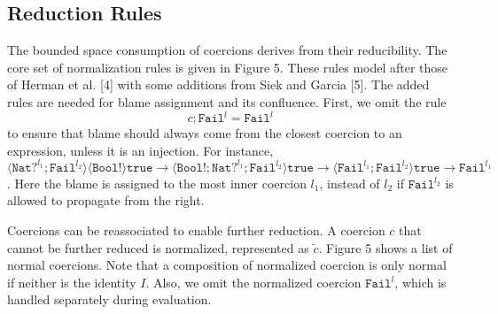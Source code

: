 \subsection{Reduction Rules}
The bounded space consumption of coercions derives from their reducibility. 
The core set of normalization rules is given in Figure 5. These rules model 
after those of Herman et al. [4] with some additions from Siek and Garcia [5]. 
The added rules are needed for blame assignment and its confluence. First, 
we omit the rule 
\begin{equation*}
    c;\texttt{Fail}^l = \texttt{Fail}^l
\end{equation*}
to ensure that blame should always come from the closest coercion to an 
expression, unless it is an injection. For instance, $\langle \texttt{Nat}?^{l_1};\texttt{Fail}^{l_2} 
\rangle \langle \texttt{Bool}! \rangle \texttt{true} \longrightarrow 
\langle \texttt{Bool}!;\texttt{Nat}?^{l_1};\texttt{Fail}^{l_2} \rangle \texttt{true}
\longrightarrow \langle \texttt{Fail}^{l_1};\texttt{Fail}^{l_2} \rangle \texttt{true}
\longrightarrow \texttt{Fail}^{l_1}$. Here the blame is assigned to the 
most inner coercion $l_1$, instead of $l_2$ 
if $\texttt{Fail}^{l_2}$ is allowed to propagate from the right. 

Coercions can be reassociated to enable further reduction. A coercion $c$ that 
cannot be further reduced is normalized, represented as $\tilde{c}$. Figure 
5 shows a list of normal coercions. Note that a composition of normalized 
coercion is only normal if neither is the identity $I$. Also, we omit 
the normalized coercion $\texttt{Fail}^l$, which is handled separately 
during evaluation. 



